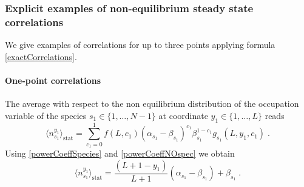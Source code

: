 \documentclass[10pt]{article}
\numberwithin{equation}{section}
\numberwithin{equation}{subsection}
\newcommand{\dt}{\;.}
\begin{document}
\subsubsection{Explicit examples of non-equilibrium steady state correlations}
We give examples  of correlations for up to three points applying formula \eqref{exactCorrelations}.
\paragraph{One-point correlations}
The average with respect to the non equilibrium distribution of the occupation variable of the species $s_{1}\in \{1,\ldots,N-1\}$ at coordinate $y_{1}\in \{1,\ldots,L\}$ reads
\begin{equation}
	\langle n_{s_{1}}^{y_{1}}\rangle_{\text{stat}}=\sum_{c_{1}=0}^{1}f(L,c_{1})(\alpha_{s_{1}}-\beta_{s_{1}})^{c_{1}}\beta_{s_{1}}^{1-c_{1}}g_{s_{1}}(L,y_{1},c_{1})\dt
\end{equation}
Using \eqref{powerCoeffSpecies} and \eqref{powerCoeffNOspec} we obtain 
\begin{equation}\label{one-pts-corr}
	\langle n_{s_{1}}^{y_{1}}\rangle_{\text{stat}}=\frac{(L+1-y_{1})}{L+1}(\alpha_{s_{1}}-\beta_{s_{1}})+\beta_{s_{1}}\dt
\end{equation}
\end{document}
